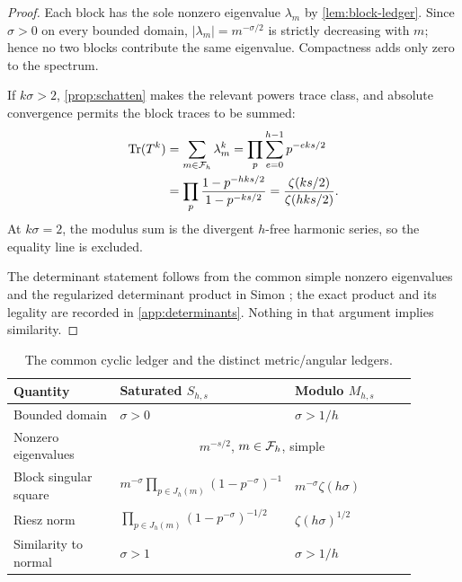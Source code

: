 \begin{proof}
Each block has the sole nonzero eigenvalue $\lambda_m$ by
\cref{lem:block-ledger}.  Since $\sigma>0$ on every bounded domain,
$|\lambda_m|=m^{-\sigma/2}$ is strictly decreasing with $m$; hence no two
blocks contribute the same eigenvalue.  Compactness adds only zero to the
spectrum.

If $k\sigma>2$, \cref{prop:schatten} makes the relevant powers trace
class, and absolute convergence permits the block traces to be summed:
\begin{align*}
  \operatorname{Tr}(T^k)
    &=\sum_{m\in\mathcal F_h}\lambda_m^k
      =\prod_p\sum_{e=0}^{h-1}p^{-eks/2}\\
    &=\prod_p\frac{1-p^{-hks/2}}{1-p^{-ks/2}}
      =\frac{\zeta(ks/2)}{\zeta(hks/2)}.
\end{align*}
At $k\sigma=2$, the modulus sum is the divergent $h$-free harmonic
series, so the equality line is excluded.

The determinant statement follows from the common simple nonzero
eigenvalues and the regularized determinant product in Simon
\cite[Ch.~9, pp.~75--80]{Simon2005}; the exact product and its legality are recorded in
\cref{app:determinants}.  Nothing in that argument implies similarity.
\end{proof}

\begin{table}[t]
\centering
\caption{The common cyclic ledger and the distinct metric/angular ledgers.}
\label{tab:ledgers}
\begin{tabular}{@{}p{0.27\linewidth}p{0.31\linewidth}p{0.31\linewidth}@{}}
\toprule
Quantity & Saturated $S_{h,s}$ & Modulo $M_{h,s}$ \\
\midrule
Bounded domain & $\sigma>0$ & $\sigma>1/h$ \\
Nonzero eigenvalues & \multicolumn{2}{c}{$m^{-s/2}$, $m\in\mathcal F_h$, simple} \\
Block singular square & $m^{-\sigma}\prod_{p\in J_h(m)}(1-p^{-\sigma})^{-1}$
 & $m^{-\sigma}\zeta(h\sigma)$ \\
Riesz norm & $\prod_{p\in J_h(m)}(1-p^{-\sigma})^{-1/2}$
 & $\zeta(h\sigma)^{1/2}$ \\
Similarity to normal & $\sigma>1$ & $\sigma>1/h$ \\
\bottomrule
\end{tabular}
\end{table}
